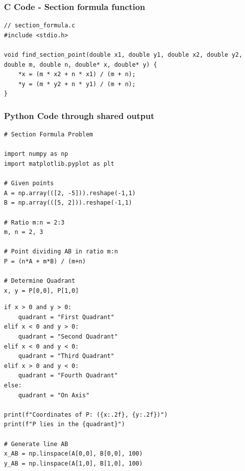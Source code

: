 \documentclass{beamer}
\begin{document}
	\begin{frame}[fragile]
		\frametitle{C Code - Section formula function }
		
		\begin{lstlisting}
// section_formula.c
#include <stdio.h>

void find_section_point(double x1, double y1, double x2, double y2, double m, double n, double* x, double* y) {
	*x = (m * x2 + n * x1) / (m + n);
	*y = (m * y2 + n * y1) / (m + n);
}
			\end{lstlisting}
		\end{frame}


\begin{frame}[fragile]
	\frametitle{Python Code through shared output}
	\begin{lstlisting}
# Section Formula Problem

import numpy as np
import matplotlib.pyplot as plt

# Given points
A = np.array(([2, -5])).reshape(-1,1)
B = np.array(([5, 2])).reshape(-1,1)

# Ratio m:n = 2:3
m, n = 2, 3

# Point dividing AB in ratio m:n
P = (n*A + m*B) / (m+n)

# Determine Quadrant
x, y = P[0,0], P[1,0]
	\end{lstlisting}
\end{frame}

\begin{frame}[fragile]
	\begin{lstlisting}
if x > 0 and y > 0:
    quadrant = "First Quadrant"
elif x < 0 and y > 0:
    quadrant = "Second Quadrant"
elif x < 0 and y < 0:
    quadrant = "Third Quadrant"
elif x > 0 and y < 0:
    quadrant = "Fourth Quadrant"
else:
    quadrant = "On Axis"

print(f"Coordinates of P: ({x:.2f}, {y:.2f})")
print(f"P lies in the {quadrant}")

# Generate line AB
x_AB = np.linspace(A[0,0], B[0,0], 100)
y_AB = np.linspace(A[1,0], B[1,0], 100)

	\end{lstlisting}
\end{frame}
\end{document}
